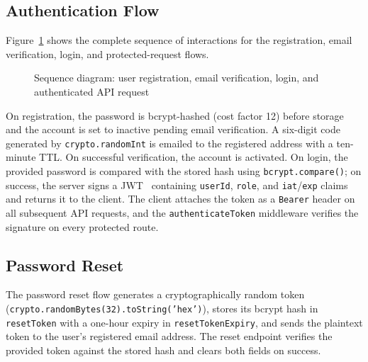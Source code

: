 \subsection{Authentication Flow}

Figure~\ref{fig:seq_auth} shows the complete sequence of interactions for
the registration, email verification, login, and protected-request flows.

\begin{figure}[H]
  \centering
  \resizebox{\linewidth}{!}{}
  \caption{Sequence diagram: user registration, email verification, login,
           and authenticated API request}
  \label{fig:seq_auth}
\end{figure}

On registration, the password is bcrypt-hashed (cost factor 12) before
storage and the account is set to inactive pending email verification. A
six-digit code generated by \texttt{crypto.randomInt} is emailed to the
registered address with a ten-minute TTL. On successful verification, the
account is activated. On login, the provided password is compared with the
stored hash using \texttt{bcrypt.compare()}; on success, the server signs
a JWT~\cite{jwt2015} containing \texttt{userId}, \texttt{role}, and
\texttt{iat}/\texttt{exp} claims and returns it to the client. The client
attaches the token as a \texttt{Bearer} header on all subsequent API requests,
and the \texttt{authenticateToken} middleware verifies the signature on every
protected route.

\subsection{Password Reset}

The password reset flow generates a cryptographically random token
(\texttt{crypto.randomBytes(32).toString('hex')}), stores its bcrypt hash
in \texttt{resetToken} with a one-hour expiry in \texttt{resetTokenExpiry},
and sends the plaintext token to the user's registered email address. The
reset endpoint verifies the provided token against the stored hash and
clears both fields on success.
